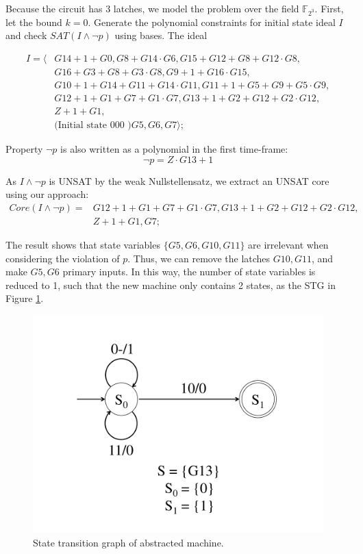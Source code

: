 \begin{Example}
Because the circuit has 3 latches, we model the problem over the field
${\mathbb{F}}_{2^3}$. First, let the bound $k = 0$. Generate the
polynomial constraints for initial state ideal $I$ and check $SAT(I\land
\neg p)$ using \Grobner bases. The ideal 

\begin{align*}
I = \langle & G14+1+G0, G8+G14\cdot G6, G15+G12+G8+G12\cdot G8,\\ 
	& G16+G3+G8+G3\cdot G8, G9+1+G16\cdot G15, \\ 
	& G10+1+G14+G11+G14\cdot G11, G11+1+G5+G9+G5\cdot G9, \\
	& G12+1+G1+G7+G1\cdot G7, G13+1+G2+G12+G2\cdot G12, \\
	& Z+1+G1, \\
	& \text{(Initial state 000 )} G5, G6, G7 \rangle;
\end{align*}

Property $\neg p$ is also written as a polynomial in the first
time-frame: 
\begin{equation*}
\neg p = Z\cdot G13 + 1
\end{equation*}

As $I\land \neg p$ is UNSAT by the weak
Nullstellensatz, we extract an UNSAT core using our approach:
\begin{align*}
Core(I\land \neg p) =& G12+1+G1+G7+G1\cdot G7, G13+1+G2+G12+G2\cdot G12, \\
& Z+1+G1, G7;
\end{align*}

The result shows that state variables $\{G5,G6, G10,G11\}$ are
irrelevant when considering the violation of $p$. Thus, we can remove
the latches $G10, G11$, and make $G5,G6$ primary inputs. In this way,
the number of state variables is reduced to 1, such that the new
machine only contains 2 states, as the STG in Figure \ref{fig:s27_stg_refined}.

\begin{figure}[tbp]
\centerline{\includegraphics[width=4.5in]{newfig/s27_stg_refined.pdf}}
\caption{State transition graph of abstracted machine.}
\label{fig:s27_stg_refined}
\end{figure}


\end{Example}
